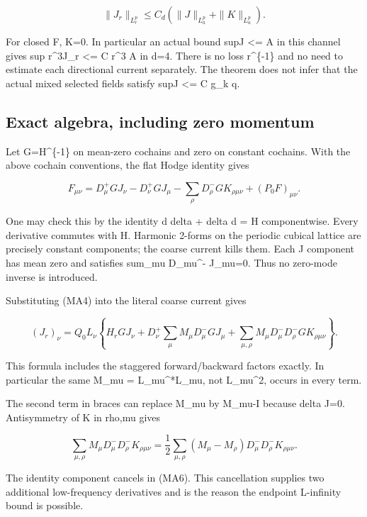 \documentclass[
  11pt,
]{article}
\begin{document}
\[
\|J_r\|_{L_r^p}\le C_d(\|J\|_{L_a^p}+\|K\|_{L_a^p}).
\tag{MA3}
\]

For closed F, K=0. In particular an actual bound sup\textbar J\textbar{}
\textless= A in this channel gives sup r\^{}3\textbar J\_r\textbar{}
\textless= C r\^{}3 A in d=4. There is no loss r\^{}\{-1\} and no need
to estimate each directional current separately. The theorem does not
infer that the actual mixed selected fields satisfy
sup\textbar J\textbar{} \textless= C g\_k q.

\hypertarget{exact-algebra-including-zero-momentum}{%
\subsection{Exact algebra, including zero
momentum}\label{exact-algebra-including-zero-momentum}}

Let G=H\^{}\{-1\} on mean-zero cochains and zero on constant cochains.
With the above cochain conventions, the flat Hodge identity gives

\[
F_{\mu\nu}=D_\mu^+GJ_\nu-D_\nu^+GJ_\mu
 -\sum_\rho D_\rho^-GK_{\rho\mu\nu}+(P_0F)_{\mu\nu}.
\tag{MA4}
\]

One may check this by the identity d delta + delta d = H componentwise.
Every derivative commutes with H. Harmonic 2-forms on the periodic
cubical lattice are precisely constant components; the coarse current
kills them. Each J component has mean zero and satisfies sum\_mu
D\_mu\^{}- J\_mu=0. Thus no zero-mode inverse is introduced.

Substituting (MA4) into the literal coarse current gives

\[
(J_r)_\nu=Q_0L_\nu\left\{
 H_r GJ_\nu
 +D_\nu^+\sum_\mu M_\mu D_\mu^-GJ_\mu
 +\sum_{\mu,\rho}M_\mu D_\mu^-D_\rho^-GK_{\rho\mu\nu}
\right\}.
\tag{MA5}
\]

This formula includes the staggered forward/backward factors exactly. In
particular the same M\_mu = L\_mu\^{}*L\_mu, not L\_mu\^{}2, occurs in
every term.

The second term in braces can replace M\_mu by M\_mu-I because delta
J=0. Antisymmetry of K in rho,mu gives

\[
\sum_{\mu,\rho}M_\mu D_\mu^-D_\rho^-K_{\rho\mu\nu}
=\frac12\sum_{\mu,\rho}(M_\mu-M_\rho)
D_\mu^-D_\rho^-K_{\rho\mu\nu}.
\tag{MA6}
\]

The identity component cancels in (MA6). This cancellation supplies two
additional low-frequency derivatives and is the reason the endpoint
L-infinity bound is possible.
\end{document}
